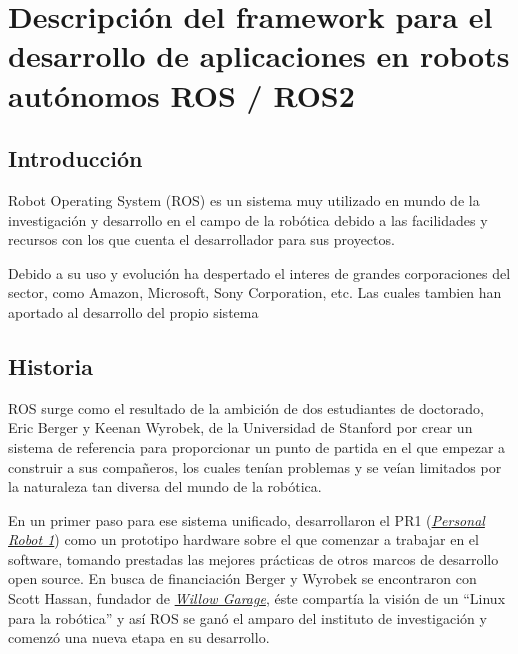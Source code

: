 

\chapter{Descripción del framework para el desarrollo de aplicaciones en robots autónomos ROS / ROS2 
}

\section{Introducción}
Robot Operating System (ROS) es un sistema muy utilizado en mundo de la investigación y desarrollo en el campo de la robótica debido a las facilidades y recursos con los que cuenta el desarrollador para sus proyectos.

Debido a su uso y evolución ha despertado el interes de grandes corporaciones del sector, como Amazon, Microsoft, Sony Corporation, etc. Las cuales tambien han aportado al desarrollo del propio sistema



\section{Historia}
ROS surge como el resultado de la ambición de dos estudiantes de doctorado, Eric Berger y Keenan Wyrobek, de la Universidad de Stanford por crear un sistema de referencia para proporcionar un punto de partida en el que empezar a construir a sus compañeros, los cuales tenían problemas y se veían limitados por la naturaleza tan diversa del mundo de la robótica.
\newpage

En un primer paso para ese sistema unificado, desarrollaron el PR1 (\href{https://robots.ieee.org/robots/pr1/}{\textit{Personal Robot 1}}) como un prototipo hardware sobre el que comenzar a trabajar en el software, tomando prestadas las mejores prácticas de otros marcos de desarrollo open source. En busca de financiación Berger y Wyrobek se encontraron con Scott Hassan, fundador de \href{https://www.businessinsider.com/a-look-back-at-willow-garage-2016-2}{\textit{Willow Garage}}, éste compartía la visión de un ``Linux para la robótica'' y así ROS se ganó el amparo del instituto de investigación y comenzó una nueva etapa en su desarrollo.

